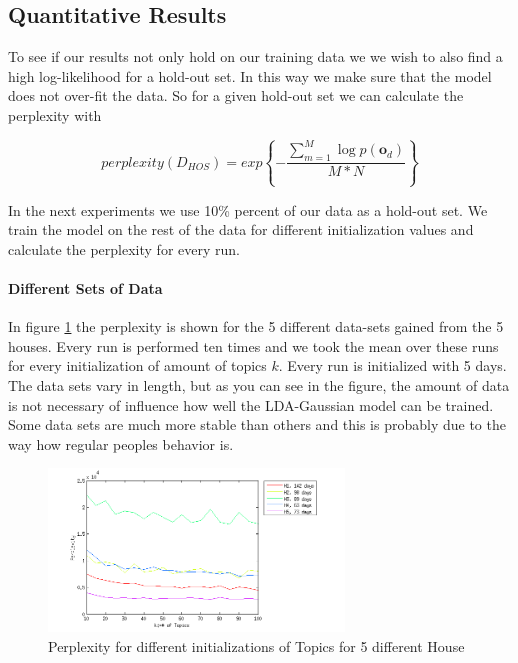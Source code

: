 \documentclass[11pt,a4paper]{article}
\begin{document}
\pagebreak

\subsection{Quantitative Results}
To see if our results not only hold on our training data we we wish to also find a high log-likelihood for a hold-out set. In this way we make sure that the model does not over-fit the data. So for a given hold-out set we can calculate the perplexity with 

\begin{equation}
 perplexity(D_{HOS}) = exp \left\{ - \frac{\sum_{m=1}^M \log p(\textbf{o}_d ) }{M*N} \right\}
\end{equation}

In the next experiments we use 10\% percent of our data as a hold-out set. We train the model on the rest of the data for different initialization values and calculate the perplexity for every run.

\paragraph{Different Sets of Data}
In figure \ref{fig:PerplGaus} the perplexity is shown for the 5 different data-sets gained from the 5 houses. Every run is performed ten times and we took the mean over these runs for every initialization of amount of topics $k$. Every run is initialized with 5 days.
The data sets vary in length, but as you can see in the figure, the amount of data is not necessary of influence how well the LDA-Gaussian model can be trained. Some data sets are much more stable than others and this is probably due to the way how regular peoples behavior is.

\begin{figure}[h!]
 \centering
 \includegraphics[width=0.7\textwidth]{Pictures/PerplGaus.png}
 \caption{Perplexity for different initializations of Topics for 5 different House}
 \label{fig:PerplGaus}
\end{figure}
\end{document}
